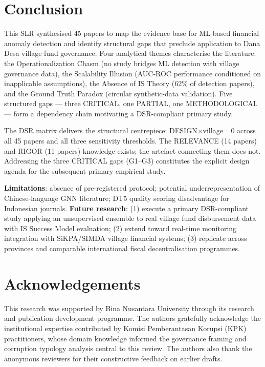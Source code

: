 \documentclass[3p,times,procedia]{elsarticle}
\begin{document}
\section{Conclusion}
\label{sec:conclusion}

This SLR synthesised 45 papers to map the evidence base for ML-based financial anomaly
detection and identify structural gaps that preclude application to Dana Desa village fund
governance. Four analytical themes characterise the literature: the Operationalization
Chasm (no study bridges ML detection with village governance data), the Scalability
Illusion (AUC-ROC performance conditioned on inapplicable assumptions), the Absence of
IS Theory (62\% of detection papers), and the Ground Truth Paradox (circular synthetic-data
validation). Five structured gaps --- three CRITICAL, one PARTIAL, one METHODOLOGICAL ---
form a dependency chain motivating a DSR-compliant primary study.

The DSR matrix delivers the structural centrepiece: DESIGN$\times$village\,=\,0 across
all 45 papers and all three sensitivity thresholds. The RELEVANCE (14 papers) and RIGOR
(11 papers) knowledge exists; the artefact connecting them does not. Addressing the three
CRITICAL gaps (G1--G3) constitutes the explicit design agenda for the subsequent primary
empirical study.

\textbf{Limitations}: absence of pre-registered protocol; potential underrepresentation of
Chinese-language GNN literature; DT5 quality scoring disadvantage for Indonesian journals.
\textbf{Future research}: (1) execute a primary DSR-compliant study applying an
unsupervised ensemble to real village fund disbursement data with IS Success Model
evaluation; (2) extend toward real-time monitoring integration with
SiKPA/SIMDA village financial systems; (3) replicate across provinces and comparable
international fiscal decentralisation programmes.

\section*{Acknowledgements}
This research was supported by Bina Nusantara University through its research and
publication development programme. The authors gratefully acknowledge the institutional
expertise contributed by Komisi Pemberantasan Korupsi (KPK) practitioners, whose domain
knowledge informed the governance framing and corruption typology analysis central to
this review. The authors also thank the anonymous reviewers for their constructive
feedback on earlier drafts.

\def\url#1{}%
\def\urlprefix{}%


\end{document}
